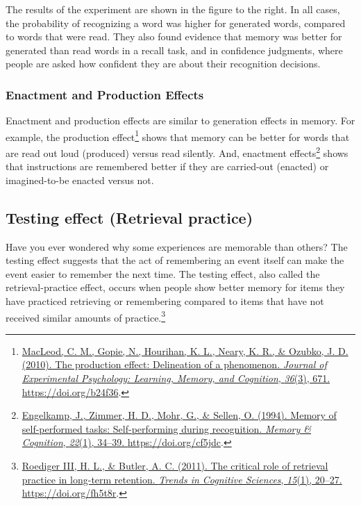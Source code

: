 \documentclass[
  oneside,
  12pt]{crumpbook}
\begin{document}
The results of the experiment are shown in the figure to the right. In all cases, the probability of recognizing a word was higher for generated words, compared to words that were read. They also found evidence that memory was better for generated than read words in a recall task, and in confidence judgments, where people are asked how confident they are about their recognition decisions.

\hypertarget{enactment-and-production-effects}{%
\subsubsection{Enactment and Production Effects}\label{enactment-and-production-effects}}

Enactment and production effects are similar to generation effects in memory. For example, the production effect\footnote{\protect\hyperlink{ref-macleodProductionEffectDelineation2010}{MacLeod, C. M., Gopie, N., Hourihan, K. L., Neary, K. R., \& Ozubko, J. D. (2010). The production effect: Delineation of a phenomenon. \emph{Journal of Experimental Psychology: Learning, Memory, and Cognition}, \emph{36}(3), 671. \url{https://doi.org/b24f36}}.} shows that memory can be better for words that are read out loud (produced) versus read silently. And, enactment effects\footnote{\protect\hyperlink{ref-engelkampMemorySelfperformedTasks1994}{Engelkamp, J., Zimmer, H. D., Mohr, G., \& Sellen, O. (1994). Memory of self-performed tasks: {Self}-performing during recognition. \emph{Memory \& Cognition}, \emph{22}(1), 34--39. \url{https://doi.org/cf5jdc}}.} shows that instructions are remembered better if they are carried-out (enacted) or imagined-to-be enacted versus not.

\hypertarget{testing-effect-retrieval-practice}{%
\subsection{Testing effect (Retrieval practice)}\label{testing-effect-retrieval-practice}}

Have you ever wondered why some experiences are memorable than others? The testing effect suggests that the act of remembering an event itself can make the event easier to remember the next time. The testing effect, also called the retrieval-practice effect, occurs when people show better memory for items they have practiced retrieving or remembering compared to items that have not received similar amounts of practice.\footnote{\protect\hyperlink{ref-roedigeriiiCriticalRoleRetrieval2011}{Roediger III, H. L., \& Butler, A. C. (2011). The critical role of retrieval practice in long-term retention. \emph{Trends in Cognitive Sciences}, \emph{15}(1), 20--27. \url{https://doi.org/fh5t8r}}.}
\end{document}
